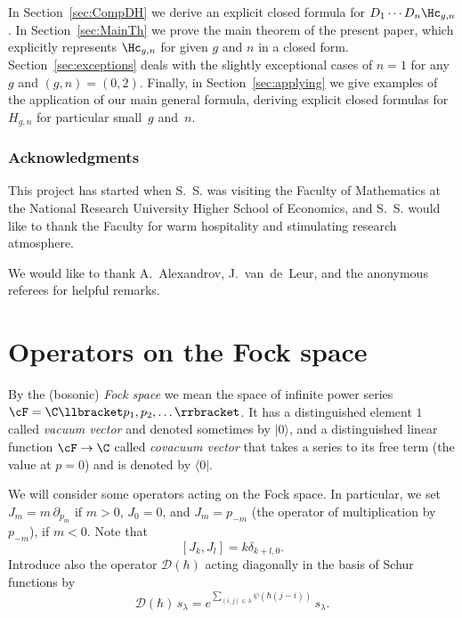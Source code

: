 In Section~\ref{sec:CompDH} we derive an explicit closed formula for $D_1\cdots D_n\Hc_{g,n}$. In Section~\ref{sec:MainTh} we prove the main theorem of the present paper, which explicitly represents $\Hc_{g,n}$ for given $g$ and $n$ in a closed form. Section~\ref{sec:exceptions} deals with the slightly exceptional cases of $n=1$ for any $g$ and $(g,n)=(0,2)$. Finally, in Section~\ref{sec:applying} we give examples of the application of our main general formula, deriving explicit closed formulas for $H_{g,n}$ for particular small~$g$ and~$n$.

\subsubsection*{Acknowledgments}
This project has started when S.~S. was visiting the Faculty of Mathematics at the National Research University Higher School of Economics, and S.~S. would like to thank the Faculty for warm hospitality and stimulating research atmosphere.

We would like to thank A.~Alexandrov, J.~van~de~Leur, and the anonymous referees for helpful remarks.

\section{Operators on the Fock space} \label{sec:OperFockSpace}

By the (bosonic) \emph{Fock space} we mean the space of infinite power series $\cF=\C\llbracket p_1,p_2,\dots\rrbracket $. It has a distinguished element $1$ called \emph{vacuum vector} and denoted sometimes by $\big| 0 \big\rangle$, and a distinguished linear function $\cF\to\C$ called \emph{covacuum vector} that takes a series to its free term (the value at $p=0$) and is denoted by $\big\langle 0 \big|$.

\Changel
We will consider some operators acting on the Fock space. In particular, we set $J_m=m\,\partial_{p_m}$ if $m>0$, $J_0=0$, and $J_m=p_{-m}$ (the operator of multiplication by $p_{-m}$), if $m<0$. Note that
\begin{equation}\label{eq:Jcomm}
[J_k, J_l] = k\delta_{k+l,0}.
\end{equation}
Introduce also the operator $\mathcal{D}(\hbar)$ acting diagonally in the basis of Schur functions by
\begin{equation*} \label{eq:action-of-D}
\mathcal{D}(\hbar)\,s_\lambda =
e^{\sum\limits_{(i,j)\in\lambda} \psi(\hbar(j-i))}\,s_\lambda.
\end{equation*}

